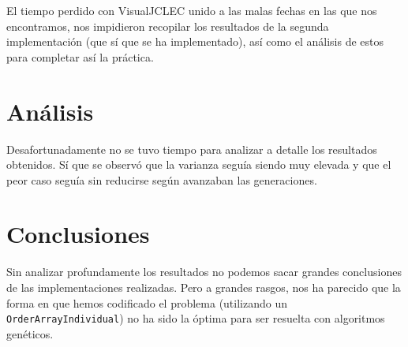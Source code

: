 \documentclass[a4paper,12pt,titlepage]{article}
\begin{document}
El tiempo perdido con VisualJCLEC unido a las malas fechas en las que nos encontramos, nos impidieron recopilar los resultados de la segunda implementación (que sí que se ha implementado), así como el análisis de estos para completar así la práctica.

\section{Análisis}

Desafortunadamente no se tuvo tiempo para analizar a detalle los resultados obtenidos. Sí que se observó que la varianza seguía siendo muy elevada y que el peor caso seguía sin reducirse según avanzaban las generaciones.
	 
\section{Conclusiones}

Sin analizar profundamente los resultados no podemos sacar grandes conclusiones de las implementaciones realizadas. Pero a grandes rasgos, nos ha parecido que la forma en que hemos codificado el problema (utilizando un \lstinline|OrderArrayIndividual|) no ha sido la óptima para ser resuelta con algoritmos genéticos.

\newpage


\end{document}
